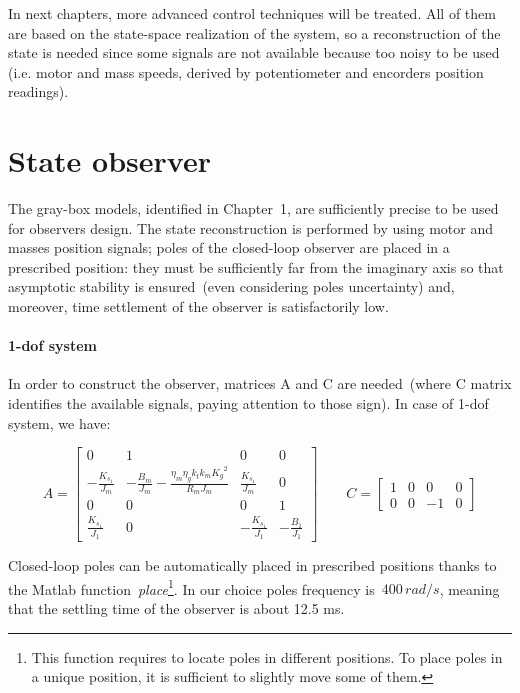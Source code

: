 
In next chapters, more advanced control techniques will be treated. All of them are based on the state-space realization of the system, so a reconstruction of the state is needed since some signals are not available because too noisy to be used (i.e. motor and mass speeds, derived by potentiometer and encorders position readings).

\section{State observer}

The gray-box models, identified in Chapter~1, are sufficiently precise to be used for observers design. The state reconstruction is performed by using motor and masses position signals; poles of the closed-loop observer are placed in a prescribed position: they must be sufficiently far from the imaginary axis so that asymptotic stability is ensured~(even considering poles uncertainty) and, moreover, time settlement of the observer is satisfactorily low.

\paragraph{\acrshort{1-dof} system}

In order to construct the observer, matrices A and C are needed~(where C matrix identifies the available signals, paying attention to those sign). In case of \acrshort{1-dof} system, we have:

\begin{equation}
	A = 
	\begin{bmatrix}
		0 &1 & 0 & 0 \\
		-\frac{K_{s_1}}{J_m} & -\frac{B_m}{J_m}-\frac{\eta_m \eta_g k_t k_m {K_g}^2}{R_m J_m}  & \frac{K_{s_1}}{J_m} & 0 \\
		0 & 0 & 0 & 1 \\
		\frac{K_{s_1}}{J_1} & 0 & -\frac{K_{s_1}}{J_1} & -\frac{B_1}{J_1}
	\end{bmatrix}
	\qquad
	C =
	\begin{bmatrix}
		1 & 0 & 0 & 0 \\
		0 & 0 & -1 & 0
	\end{bmatrix}
\end{equation}

Closed-loop poles can be automatically placed in prescribed positions thanks to the Matlab function~\textit{place}\footnote{This function requires to locate poles in different positions. To place poles in a unique position, it is sufficient to slightly move some of them.}.
In our choice poles frequency is~$400 \, rad/s$, meaning that the settling time of the observer is about 12.5 ms.

